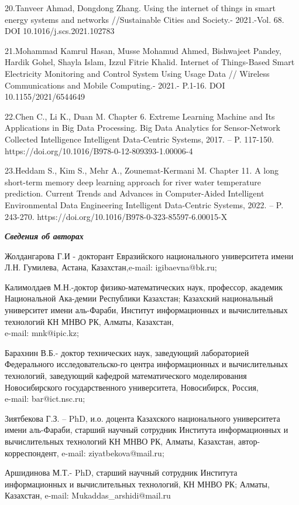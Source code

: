 \begin{noparindent}
20.Tanveer Ahmad, Dongdong Zhang. Using the internet of things in smart
energy systems and networks //Sustainable Cities and Society.-
2021.-Vol. 68. DOI 10.1016/j.scs.2021.102783

21.Mohammad Kamrul Hasan, Musse Mohamud Ahmed, Bishwajeet Pandey, Hardik
Gohel, Shayla Islam, Izzul Fitrie Khalid. Internet of Things-Based Smart
Electricity Monitoring and Control System Using Usage Data // Wireless
Communications and Mobile Computing.- 2021.- P.1-16. DOI 10.1155/2021/6544649

22.Chen C., Li K., Duan M. Chapter 6. Extreme Learning Machine and Its
Applications in Big Data Processing. Big Data Analytics for
Sensor-Network Collected Intelligence Intelligent Data-Centric Systems,
2017. -- P. 117-150.\\https://doi.org/10.1016/B978-0-12-809393-1.00006-4

23.Heddam S., Kim S., Mehr A., Zounemat-Kermani M. Chapter 11. A long
short-term memory deep learning approach for river water temperature
prediction. Current Trends and Advances in Computer-Aided Intelligent
Environmental Data Engineering Intelligent Data-Centric Systems, 2022.
-- P. 243-270. https://doi.org/10.1016/B978-0-323-85597-6.00015-X
\end{noparindent}


\emph{{\bfseries Сведения об авторах}}

\begin{noparindent}

Жолдангарова Г.И - докторант Евразийского национального университета
имени Л.Н. Гумилева, Астана, Казахстан,e-mail: igibaevna@bk.ru;

Калимолдаев М.Н.-доктор физико-математических наук, профессор, академик
Национальной Ака-демии Республики Казахстан; Казахский национальный
университет имени аль-Фараби, Институт информационных и вычислительных
технологий КН МНВО РК, Алматы, Казахстан,\\ e-mail: mnk@ipic.kz;

Барахнин В.Б.- доктор технических наук, заведующий лабораторией
Федерального исследовательско-го центра информационных и вычислительных
технологий, заведующий кафедрой математического моделирования
Новосибирского государственного университета, Новосибирск, Россия,
\\e-mail: bar@ict.nsc.ru;

Зиятбекова Г.З. -- PhD, и.о. доцента Казахского национального
университета имени аль-Фараби, старший научный сотрудник Института
информационных и вычислительных технологий КН МНВО РК, Алматы,
Казахстан, автор-корреспондент, e-mail: ziyatbekova@mail.ru;

Аршидинова М.Т.- PhD, старший научный сотрудник Института информационных
и вычислительных технологий, КН МНВО РК; Алматы, Казахстан, e-mail:
Mukaddas\_arshidi@mail.ru
\end{noparindent}


